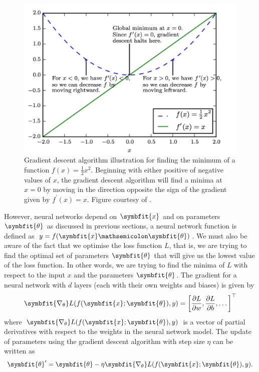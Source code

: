 \begin{figure}[hb]
    \centering
    \captionsetup{justification=RaggedRight}
    \includegraphics[scale=0.15]{chapters/assets/gradient_descent_basic.png}
    \caption{Gradient descent algorithm illustration for finding the minimum of a function $f(x) = \frac{1}{2}x^2$. Beginning with either positive of negative values of $x$, the gradient descent algorithm will find a minima at $x=0$ by moving in the direction opposite the sign of the gradient given by $f^\prime(x)=x$. Figure courtesy of \textcite{GoodfellowDLBook2016}.}
    \label{fig:gradient-descent}
\end{figure}

 However, neural networks depend on $\symbfit{x}$ and on parameters $\symbfit{\theta}$ as discussed in previous sections, a neural network function is defined as $y = f(\symbfit{x} \mathsemicolon \symbfit{\theta})$. We must also be aware of the fact that we optimise the loss function $L$, that is, we are trying to find the optimal set of parameters $\symbfit{\theta}$ that will give us the lowest value of the loss function. In other words, we are trying to find the minima of $L$ with respect to the input $x$ and the parameters $\symbfit{\theta}$.
The gradient for a neural network with $d$ layers (each with their own weights and biases) is given by
\begin{equation}
    \symbfit{\nabla_{\theta}} L(f(\symbfit{x};\symbfit{\theta}), y) = \bigg[\frac{\partial L}{\partial w}, \frac{\partial L}{\partial b}, \ldots \bigg]^\top
\end{equation}
where $\symbfit{\nabla_{\theta}} L(f(\symbfit{x};\symbfit{\theta}), y)$ is a vector of partial derivatives with respect to the weights in the neural network model. The update of parameters using the gradient descent algorithm with step size $\eta$ can be written as
\begin{equation}
    \label{eqn:basic-gd}
    \symbfit{\theta}^\prime=\symbfit{\theta}-\eta \symbfit{\nabla_{\theta}} L(f(\symbfit{x};\symbfit{\theta}), y).
\end{equation}

